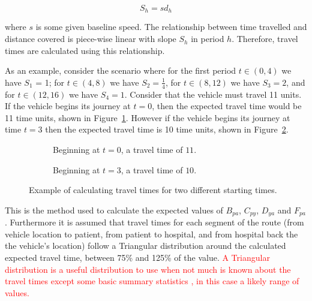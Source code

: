 \documentclass[numbers,webpdf,imaman]{ima-authoring-template}%
\begin{document}
\begin{equation}\label{eqn:speed}
S_h = s d_h
\end{equation}

\noindent
where $s$ is some given baseline speed. The relationship between time travelled
and distance covered is piece-wise linear with slope $S_h$ in period $h$.
Therefore, travel times are calculated using this relationship.

As an example, consider the scenario where for the first period $t \in (0, 4)$
we have $S_1$ = 1; for $t \in (4, 8)$ we have $S_2 = \frac{1}{4}$, for
$t \in (8, 12)$ we have $S_3 = 2$, and for $t \in (12, 16)$ we have $S_4 = 1$.
Consider that the vehicle must travel 11 units. If the vehicle begins its
journey at $t=0$, then the expected travel time would be 11 time units, shown
in Figure~\ref{fig:travel_times_1}. However if the vehicle begins its journey
at time $t=3$ then the expected travel time is 10 time units, shown in
Figure~\ref{fig:travel_times_2}.

\begin{figure}
    \begin{center}
    \begin{subfigure}{6.6cm}
    
    \caption{Beginning at $t=0$, a travel time of $11$.}
    \label{fig:travel_times_1}
    \end{subfigure}
    \begin{subfigure}{6.6cm}
    
    \caption{Beginning at $t=3$, a travel time of $10$.}
    \label{fig:travel_times_2}
    \end{subfigure}
    \end{center}
    \caption{Example of calculating travel times for two different starting
    times.}
    \label{fig:travel_times}
\end{figure}

This is the method used to calculate the expected values of $B_{pa}$, $C_{py}$,
$D_{ya}$ and $F_{pa}$.
Furthermore it is assumed that travel times for each segment of the route
(from vehicle location to patient, from patient to hospital, and from hospital
back the the vehicle's location) follow a Triangular distribution around the
calculated expected travel time, between 75\% and 125\% of the value.
\textcolor{red}{A Triangular distribution is a useful distribution to use when
not much is known about the travel times except some basic summary statistics
\citep{robinson2014simulation}, in this case a likely range of values.}
\end{document}

